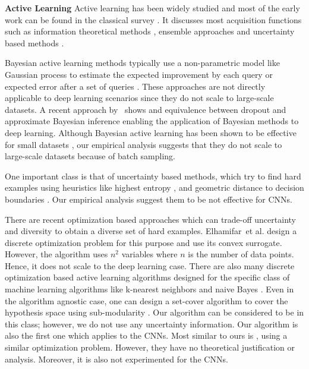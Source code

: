 \documentclass{article} %
\begin{document}
\noindent\textbf{Active Learning} Active learning has been widely studied and
most of the early work can be found in the classical survey
\citep{settles2010active}. It discusses most acquisition functions such as
information theoretical methods \citep{mackay1992information}, ensemble
approaches \citep{mccallumzy1998employing, freund1997selective} and uncertainty
based methods
\citep{tong2001support,lewissequential,joshi2009multi,li2013adaptive}.

Bayesian active learning methods typically use a non-parametric model like
Gaussian process to estimate the expected improvement by each query
\citep{kapoor2007active} or expected error after a set of queries
\citep{roy2001toward}. These approaches are not directly applicable to deep learning
scenarios since they do not scale to large-scale datasets. A recent approach by~\citet{gal_bayes} shows and equivalence between dropout and approximate
Bayesian inference enabling the application of Bayesian methods to deep
learning. Although Bayesian active learning has been shown to be effective
for small datasets \citep{gal_active}, our empirical analysis suggests that they do not scale to large-scale datasets because of batch sampling.

One important class is that of uncertainty based methods, which try to find hard
examples using heuristics like highest entropy \citep{joshi2009multi}, and
geometric distance to decision boundaries
\citep{tong2001support,brinker2003incorporating}. Our empirical analysis suggest them to be not effective for CNNs.


There are recent optimization based approaches which can trade-off uncertainty
and diversity to obtain a diverse set of hard examples. Elhamifar~et al.
\citep{elhamifar2013convex} design a discrete optimization problem for this
purpose and use its convex surrogate. However, the algorithm uses $n^2$
variables where $n$ is the number of data points. Hence, it does not scale to
the deep learning case. There are also many discrete optimization based active
learning algorithms designed for the specific class of machine learning
algorithms like k-nearest neighbors and naive Bayes \citep{wei2015submodularity}.
Even in the algorithm agnostic case, one can design a set-cover algorithm to
cover the hypothesis space using sub-modularity \citep{guillory2010interactive,
golovin2011adaptive}. Our algorithm can be considered to be in this class;
however, we do not use any uncertainty information. Our algorithm is also the
first one which applies to the CNNs. Most similar to ours is \citep{porikli},
using a similar optimization problem. However, they have no theoretical
justification or analysis. Moreover, it is also not experimented for the CNNs.
\end{document}
